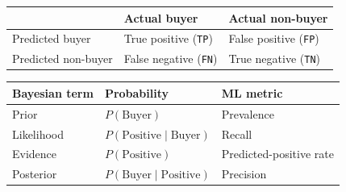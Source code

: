 \documentclass[11pt,border=0pt,multi={tableimage}]{standalone}
\newcommand{\code}[1]{\texttt{#1}}
\newenvironment{tableimage}{\begin{minipage}{6.5in}\centering}{\end{minipage}}
\begin{document}
\begin{tableimage}
\begin{tabular}{lll}
\toprule
 & Actual buyer & Actual non-buyer \\
\midrule
Predicted buyer & True positive (\code{TP}) & False positive (\code{FP}) \\
Predicted non-buyer & False negative (\code{FN}) & True negative (\code{TN}) \\
\bottomrule
\end{tabular}
\end{tableimage}

\begin{tableimage}
\begin{tabularx}{\linewidth}{lXl}
\toprule
Bayesian term & Probability & ML metric \\
\midrule
Prior & $P(\text{Buyer})$ & Prevalence \\
Likelihood & $P(\text{Positive}\mid\text{Buyer})$ & Recall \\
Evidence & $P(\text{Positive})$ & Predicted-positive rate \\
Posterior & $P(\text{Buyer}\mid\text{Positive})$ & Precision \\
\bottomrule
\end{tabularx}
\end{tableimage}
\end{document}
